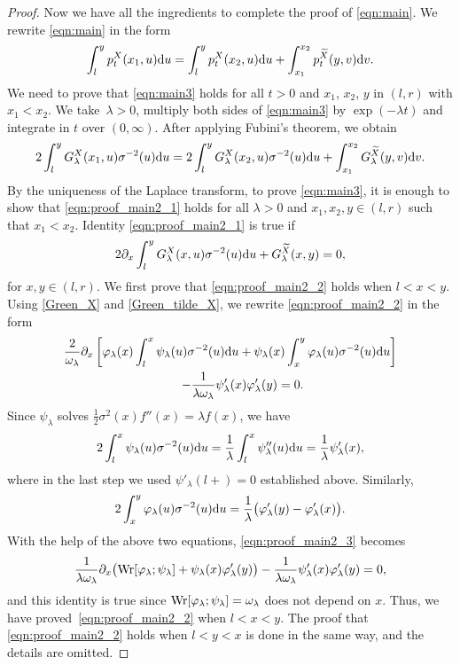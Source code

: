 \documentclass[pdftex]{sigma}
\numberwithin{equation}{section}
\theoremstyle{definition}
\def\wr{{\textnormal{Wr}}}
\def\d{{\textnormal d}}
\begin{document}
\begin{proof}
Now we have all the ingredients to complete the proof of \eqref{eqn:main}.
We rewrite
\eqref{eqn:main} in the form
\begin{gather}\label{eqn:main3}
\int_l^y p^X_t(x_1,u) \d u=\int_l^y p^X_t(x_2,u) \d u+\int_{x_1}^{x_2} p^{\widetilde X}_t(y,v) \d v.
\end{gather}
We need to prove that \eqref{eqn:main3} holds for all $t>0$ and $x_1$, $x_2$, $y$ in $(l,r)$ with $x_1<x_2$. We take~${\lambda>0}$, multiply both sides of
\eqref{eqn:main3} by $\exp(-\lambda t)$ and integrate in $t$ over $(0,\infty)$. After applying Fubini's theorem, we obtain
\begin{equation}\label{eqn:proof_main2_1}
 2 \int_l^y G^X_{\lambda}(x_1,u)
 \sigma^{-2}(u)\d u
 = 2 \int_l^y G^X_{\lambda}(x_2,u)
 \sigma^{-2}(u)\d u +\int_{x_1}^{x_2} G^{\widetilde X}_{\lambda}(y,v) \d v.
\end{equation}
By the uniqueness of the Laplace transform, to prove \eqref{eqn:main3}, it is enough to show that \eqref{eqn:proof_main2_1} holds for all $\lambda>0$ and $x_1,x_2,y \in (l,r)$ such that $x_1<x_2$. Identity \eqref{eqn:proof_main2_1} is true if
\begin{equation}\label{eqn:proof_main2_2}
 2 \partial_x \int_l^y G^X_{\lambda}(x,u) \sigma^{-2}(u)\d u + G^{\widetilde X}_{\lambda}(x,y)=0,
\end{equation}
for $x,y \in (l,r)$. We first prove that \eqref{eqn:proof_main2_2} holds when $l<x<y$. Using \eqref{Green_X} and \eqref{Green_tilde_X},
we rewrite \eqref{eqn:proof_main2_2} in the form
\begin{gather}
\frac{2}{\omega_{\lambda}}
\partial_x \left[ \varphi_{\lambda}(x) \int_l^x \psi_{\lambda}(u) \sigma^{-2}(u) \d u+ \psi_{\lambda}(x) \int_x^y \varphi_{\lambda}(u) \sigma^{-2}(u) \d u \right]
\nonumber\\
\qquad- \frac{1}{\lambda \omega_{\lambda}} \psi'_{\lambda}(x) \varphi'_{\lambda}(y)=0.\label{eqn:proof_main2_3}
\end{gather}
Since $\psi_{\lambda}$ solves $\tfrac{1}{2} \sigma^2(x) f''(x)=\lambda f(x)$, we have
\[
2\int_l^x \psi_{\lambda}(u) \sigma^{-2}(u) \d u=\frac{1}{\lambda}
\int_l^x \psi''_{\lambda}(u) \d u=\frac{1}{\lambda} \psi'_{\lambda}(x),
\]
where in the last step we used $\psi'_{\lambda}(l+)=0$ established above. Similarly,
\[
2 \int_x^y \varphi_{\lambda}(u) \sigma^{-2}(u) \d u=\frac{1}{\lambda}
\bigl( \varphi'_{\lambda}(y)-\varphi'_{\lambda}(x)\bigr).
\]
With the help of the above two equations, \eqref{eqn:proof_main2_3} becomes
\[
\frac{1}{\lambda \omega_{\lambda}}
\partial_x \bigl( \wr[\varphi_{\lambda}; \psi_{\lambda}] +
\psi_{\lambda}(x) \varphi'_{\lambda}(y) \bigr) - \frac{1}{\lambda \omega_{\lambda}}
\psi'_{\lambda}(x) \varphi'_{\lambda}(y)=0,
\]
and this identity is true since $\wr[\varphi_{\lambda}; \psi_{\lambda}]=\omega_{\lambda}$ does not depend on $x$. Thus, we have proved~\eqref{eqn:proof_main2_2} when $l<x<y$. The proof that \eqref{eqn:proof_main2_2} holds when $l<y< x$ is done in the same way, and the details are omitted.


\end{proof}
\end{document}
